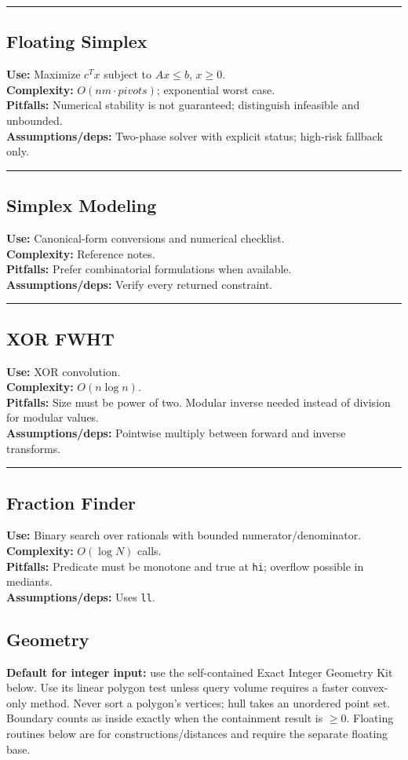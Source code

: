 \documentclass[a4paper,landscape]{article}
\newenvironment{mdnote}{%
  \begingroup
  \par\smallskip
  \small
  \setlength{\emergencystretch}{1em}%
  \setlength{\parskip}{2pt}%
  \setlength{\abovedisplayskip}{4pt}%
  \setlength{\belowdisplayskip}{4pt}%
  \setlength{\abovedisplayshortskip}{2pt}%
  \setlength{\belowdisplayshortskip}{2pt}%
}{%
  \par\endgroup
}
\newcommand{\alg}[6]{
\par\noindent\rule{\linewidth}{0.4pt}\par
\subsection{#1}
\textbf{Use:} #2\\
\textbf{Complexity:} #3\\
\textbf{Pitfalls:} #4\\
\textbf{Assumptions/deps:} #5

}
\newcommand{\notealg}[6]{
\par\noindent\rule{\linewidth}{0.4pt}\par
\subsection{#1}
\textbf{Use:} #2\\
\textbf{Complexity:} #3\\
\textbf{Pitfalls:} #4\\
\textbf{Assumptions/deps:} #5
\begin{mdnote}
\markdownInput{#6}
\end{mdnote}
}
\newcommand{\newnotebooksection}[1]{%
\setlength{\maxbalancingoverflow}{0pt}%
\end{multicols}%
\clearpage
\begin{multicols}{2}%
\section{#1}%
}
\begin{document}
\begin{multicols}{2}
\alg{Floating Simplex}{Maximize $c^Tx$ subject to $Ax\le b$, $x\ge0$.}{$O(nm\cdot pivots)$; exponential worst case.}{Numerical stability is not guaranteed; distinguish infeasible and unbounded.}{Two-phase solver with explicit status; high-risk fallback only.}{sections/math/simplex.cpp}
\notealg{Simplex Modeling}{Canonical-form conversions and numerical checklist.}{Reference notes.}{Prefer combinatorial formulations when available.}{Verify every returned constraint.}{sections/math/simplex.md}
\alg{XOR FWHT}{XOR convolution.}{$O(n\log n)$.}{Size must be power of two. Modular inverse needed instead of division for modular values.}{Pointwise multiply between forward and inverse transforms.}{sections/math/hadamard_transform.cpp}
\alg{Fraction Finder}{Binary search over rationals with bounded numerator/denominator.}{$O(\log N)$ calls.}{Predicate must be monotone and true at \texttt{hi}; overflow possible in mediants.}{Uses \texttt{ll}.}{sections/math/fraction_finder.cpp}

\newnotebooksection{Geometry}
\textbf{Default for integer input:} use the self-contained Exact Integer Geometry Kit below.
Use its linear polygon test unless query volume requires a faster convex-only method.
Never sort a polygon's vertices; hull takes an unordered point set.
Boundary counts as inside exactly when the containment result is $\ge0$.
Floating routines below are for constructions/distances and require the separate floating base.


\end{multicols}
\end{document}
